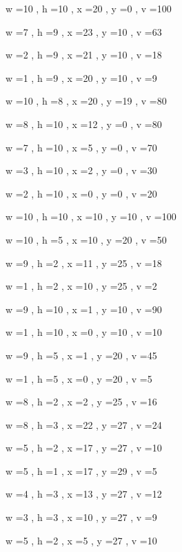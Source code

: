 \documentclass[11pt]{article}
\begin{document}


w =10 , h =10 , x =20 , y =0 , v =100
\par
w =7 , h =9 , x =23 , y =10 , v =63
\par
w =2 , h =9 , x =21 , y =10 , v =18
\par
w =1 , h =9 , x =20 , y =10 , v =9
\par
w =10 , h =8 , x =20 , y =19 , v =80
\par
w =8 , h =10 , x =12 , y =0 , v =80
\par
w =7 , h =10 , x =5 , y =0 , v =70
\par
w =3 , h =10 , x =2 , y =0 , v =30
\par
w =2 , h =10 , x =0 , y =0 , v =20
\par
w =10 , h =10 , x =10 , y =10 , v =100
\par
w =10 , h =5 , x =10 , y =20 , v =50
\par
w =9 , h =2 , x =11 , y =25 , v =18
\par
w =1 , h =2 , x =10 , y =25 , v =2
\par
w =9 , h =10 , x =1 , y =10 , v =90
\par
w =1 , h =10 , x =0 , y =10 , v =10
\par
w =9 , h =5 , x =1 , y =20 , v =45
\par
w =1 , h =5 , x =0 , y =20 , v =5
\par
w =8 , h =2 , x =2 , y =25 , v =16
\par
w =8 , h =3 , x =22 , y =27 , v =24
\par
w =5 , h =2 , x =17 , y =27 , v =10
\par
w =5 , h =1 , x =17 , y =29 , v =5
\par
w =4 , h =3 , x =13 , y =27 , v =12
\par
w =3 , h =3 , x =10 , y =27 , v =9
\par
w =5 , h =2 , x =5 , y =27 , v =10
\par
\newpage
\end{document}

